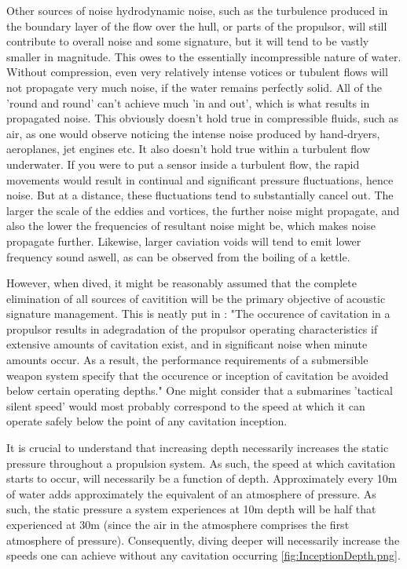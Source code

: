 \documentclass{article}\usepackage[]{graphicx}\usepackage[]{color}
\begin{document}
Other sources of noise hydrodynamic noise, such as the turbulence produced in the boundary layer of the flow over the hull, or parts of the propulsor, will still contribute to overall noise and some signature, but it will tend to be vastly smaller in magnitude.  This owes to the essentially incompressible nature of water.  Without compression, even very relatively intense votices or tubulent flows will not propagate very much noise, if the water remains perfectly solid.  All of the 'round and round' can't achieve much 'in and out', which is what results in propagated noise.  This obviously doesn't hold true in compressible fluids, such as air, as one would observe noticing the intense noise produced by hand-dryers, aeroplanes, jet engines etc.  It also doesn't hold true within a turbulent flow underwater.  If you were to put a sensor inside a turbulent flow, the rapid movements would result in continual and significant pressure fluctuations, hence noise.  But at a distance, these fluctuations tend to substantially cancel out.  The larger the scale of the eddies and vortices, the further noise might propagate, and also the lower the frequencies of resultant noise might be, which makes noise propagate further.  Likewise, larger caviation voids will tend to emit lower frequency sound aswell, as can be observed from the boiling of a kettle.

However, when dived, it might be reasonably assumed that the complete elimination of all sources of cavitition will be the primary objective of acoustic signature management.  This is neatly put in \cite[88]{gearhart1966}: "The occurence of cavitation in a propulsor results in adegradation of the propulsor operating characteristics if extensive amounts of cavitation exist, and in significant noise when minute amounts occur.  As a result, the performance requirements of a submersible weapon system specify that the occurence or inception of cavitation be avoided below certain operating depths." One might consider that a submarines 'tactical silent speed' would most probably correspond to the speed at which it can operate safely below the point of any cavitation inception.

It is crucial to understand that increasing depth necessarily increases the static pressure throughout a propulsion system.  As such, the speed at which cavitation starts to occur, will necessarily be a function of depth.  Approximately every 10m of water adds approximately the equivalent of an atmosphere of pressure.  As such, the static pressure a system experiences at 10m depth will be half that experienced at 30m (since the air in the atmosphere comprises the first atmosphere of pressure).  Consequently, diving deeper will necessarily increase the speeds one can achieve without any cavitation occurring \ref{fig:InceptionDepth.png}.
\end{document}
